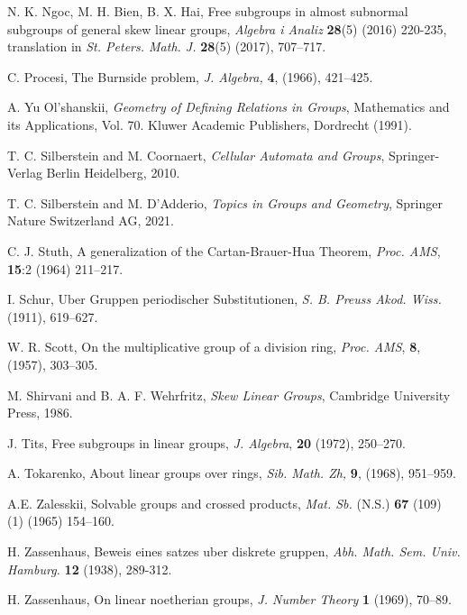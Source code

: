 \documentclass{amsart}
\theoremstyle{definition}
\begin{document}
\begin{thebibliography}{}
 N. K. Ngoc, M. H. Bien,  B. X. Hai, Free subgroups in almost subnormal subgroups of general skew linear groups, \textit{Algebra i Analiz} \textbf{28}(5) (2016) 220-235, translation in \textit{St. Peters. Math. J.} \textbf{28}(5) (2017), 707--717.
	
 C. Procesi, The Burnside problem, \textit{J. Algebra,} \textbf{4}, (1966), 421--425.

 A. Yu Ol’shanskii, \textit{Geometry of Defining Relations in Groups}, Mathematics and its Applications, Vol. 70. Kluwer Academic Publishers, Dordrecht (1991).
	
 T. C. Silberstein and M. Coornaert, \textit{Cellular Automata and Groups}, Springer-Verlag Berlin Heidelberg, 2010.
	
 T. C. Silberstein and M. D'Adderio, \textit{Topics in Groups and Geometry}, Springer Nature Switzerland AG, 2021.
	
 C. J. Stuth, A generalization of the Cartan-Brauer-Hua Theorem, \textit{Proc. AMS}, \textbf{15}:2 (1964) 211--217. 
	
 I. Schur, Uber Gruppen periodischer Substitutionen, \textit{S. B. Preuss Akod. Wiss.} (1911), 619--627.

 W. R. Scott, On the multiplicative group of a division ring, \textit{Proc. AMS}, \textbf{8}, (1957), 303--305. 

 M. Shirvani and B. A. F. Wehrfritz, \textit{Skew Linear Groups}, Cambridge University Press, 1986.

 J. Tits, Free subgroups in linear groups, \textit{J. Algebra}, \textbf{20} (1972), 250--270.
	
 A. Tokarenko, About linear groups over rings, \textit{Sib. Math. Zh,} \textbf{9}, (1968), 951--959.

 A.E. Zalesskii, Solvable groups and crossed products, \textit{Mat. Sb.} (N.S.) \textbf{67} (109) (1) (1965) 154--160.
	
 H. Zassenhaus, Beweis eines satzes uber diskrete gruppen, \textit{Abh. Math. Sem. Univ. Hamburg.} \textbf{12} (1938), 289-312.

 H. Zassenhaus, On linear noetherian groups, \textit{J. Number Theory} \textbf{1} (1969), 70--89.
	
\end{thebibliography}
\end{document}
